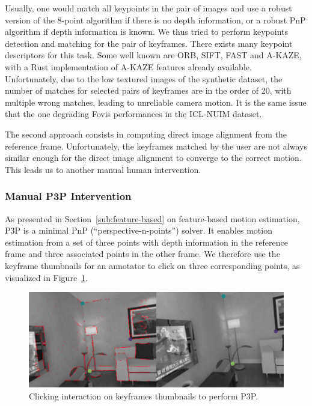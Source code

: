 Usually, one would match all keypoints in the pair of images
and use a robust version of the 8-point algorithm if there is no depth information,
or a robust PnP algorithm if depth information is known.
We thus tried to perform keypoints detection and matching for the pair of keyframes.
There exists many keypoint descriptors for this task.
Some well known are ORB, SIFT, FAST and A-KAZE,
with a Rust implementation of A-KAZE features already available.
Unfortunately, due to the low textured images of the synthetic dataset,
the number of matches for selected pairs of keyframes are in the order of 20,
with multiple wrong matches, leading to unreliable camera motion.
It is the same issue that the one degrading Fovis performances in the ICL-NUIM dataset.

The second approach consists in computing direct image alignment from the reference frame.
Unfortunately, the keyframes matched by the user are not always similar enough
for the direct image alignment to converge to the correct motion.
This leads us to another manual human intervention.

\subsubsection{Manual P3P Intervention}%

As presented in Section~\ref{sub:feature-based} on feature-based motion estimation,
P3P is a minimal PnP (``perspective-n-points'') solver.
It enables motion estimation from a set of three points with depth information
in the reference frame and three associated points in the other frame.
We therefore use the keyframe thumbnails for an annotator to click on three
corresponding points, as visualized in Figure~\ref{fig:p3p}.

\begin{figure}[ht]
	\centering
	\includegraphics[width=\linewidth]{assets/img/p3p.png}
	\caption{Clicking interaction on keyframes thumbnails to perform P3P.}%
	\label{fig:p3p}
\end{figure}

